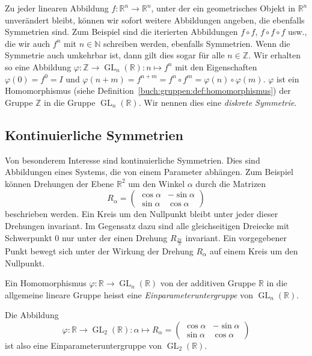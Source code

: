 Zu jeder linearen Abbildung $f\colon\mathbb{R}^n\to\mathbb{R}^n$, unter der 
ein geometrisches Objekt in $\mathbb{R}^n$ unverändert bleibt, können wir
sofort weitere Abbildungen angeben, die ebenfalls Symmetrien sind.
Zum Beispiel sind die iterierten Abbildungen $f\circ f$, $f\circ f\circ f$
usw., die wir auch $f^n$ mit $n\in\mathbb{N}$ schreiben werden,
ebenfalls Symmetrien.
Wenn die Symmetrie auch umkehrbar ist, dann gilt dies sogar für alle
$n\in\mathbb{Z}$.
Wir erhalten so eine Abbildung
$\varphi\colon \mathbb{Z}\to \operatorname{GL}_n(\mathbb{R}):n\mapsto f^n$
mit den Eigenschaften $\varphi(0)=f^0 = I$ und
$\varphi(n+m)=f^{n+m}=f^n\circ f^m = \varphi(n)\circ\varphi(m)$.
$\varphi$ ist ein Homomorphismus (siehe
Definition~\ref{buch:gruppen:def:homomorphismus})
der Gruppe $\mathbb{Z}$ in die Gruppe
$\operatorname{GL}_n(\mathbb{R})$.
Wir nennen dies eine {\em diskrete Symmetrie}.

\subsection{Kontinuierliche Symmetrien
\label{buch:subsection:kontinuierliche-symmetrien}}
Von besonderem Interesse sind kontinuierliche Symmetrien.
Dies sind Abbildungen eines Systems, die von einem Parameter
abhängen.
Zum Beispiel können Drehungen der Ebene $\mathbb{R}^2$ um den
Winkel $\alpha$ durch die Matrizen 
\[
R_{\alpha}
=
\begin{pmatrix}
\cos\alpha&-\sin\alpha\\
\sin\alpha& \cos\alpha
\end{pmatrix}
\]
beschrieben werden.
Ein Kreis um den Nullpunkt bleibt unter jeder dieser Drehungen invariant.
Im Gegensatz dazu sind alle gleichseitigen Dreiecke mit Schwerpunkt $0$
nur unter der einen Drehung $R_{\frac{2\pi}3}$ invariant.
Ein vorgegebener Punkt bewegt sich unter der Wirkung der Drehung
$R_\alpha$ auf einem Kreis um den Nullpunkt.

\begin{definition}
\label{buch:lie:def:einparameteruntergruppe}
Ein Homomorphismus $\varphi\colon\mathbb{R}\to\operatorname{GL}_n(\mathbb{R})$
von der additiven Gruppe $\mathbb{R}$ in die allgemeine lineare Gruppe
heisst eine {\em Einparameteruntergruppe} von
$\operatorname{GL}_n(\mathbb{R})$.
\end{definition}

Die Abbildung 
\[
\varphi
\colon
\mathbb{R}\to\operatorname{GL}_2(\mathbb{R})
:
\alpha \mapsto
R_{\alpha}
=
\begin{pmatrix}
\cos\alpha&-\sin\alpha\\
\sin\alpha& \cos\alpha
\end{pmatrix}
\]
ist also eine Einparameteruntergruppe von $\operatorname{GL}_2(\mathbb{R})$.

